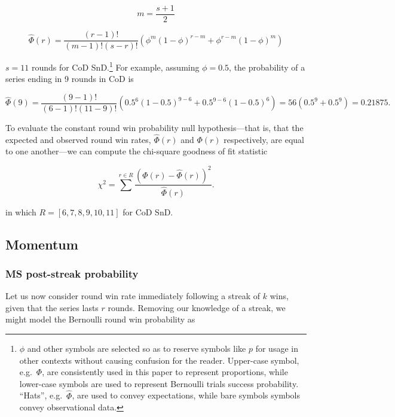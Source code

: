 \documentclass{article}
\begin{document}
\begin{equation}\label{eq:m}
m = \frac{s + 1}{2}
\end{equation}

\begin{equation}\label{eq:series-length}
\hat{\Phi}(r) = \frac{(r - 1)!}{(m - 1)!(s - r)!}(\phi^{m}(1 - \phi)^{r - m} + \phi^{r - m}(1 - \phi)^m)
\end{equation}

\(s = 11\) rounds for CoD SnD.\footnote{\(\phi\) and other symbols are
  selected so as to reserve symbols like \(p\) for usage in other
  contexts without causing confusion for the reader. Upper-case symbol,
  e.g.~\(\Phi\), are consistently used in this paper to represent
  proportions, while lower-case symbols are used to represent Bernoulli
  trials success probability. ``Hats'', e.g.~\(\hat{\Phi}\), are used to
  convey expectations, while bare symbols symbols convey observational
  data.} For example, assuming \(\phi = 0.5\), the probability of a
series ending in 9 rounds in CoD is

\[
\hat{\Phi}(9) = \frac{(9 - 1)!}{(6 - 1)!(11 - 9)!}(0.5^{6}(1 - 0.5)^{9 - 6} + 0.5^{9 - 6}(1 - 0.5)^6) = 56 (0.5^9 + 0.5^9) = 0.21875.
\]

To evaluate the constant round win probability null hypothesis---that
is, that the expected and observed round win rates, \(\hat{\Phi}(r)\)
and \(\Phi(r)\) respectively, are equal to one another---we can compute
the chi-square goodness of fit statistic

\begin{equation}\label{eq:chi-squ}
\chi^2 = \sum^{r \in R} \frac{(\Phi(r) - \hat{\Phi}(r))^2}{\hat{\Phi}(r)}.
\end{equation}

in which \(R = [6, 7, 8, 9, 10, 11]\) for CoD SnD.

\hypertarget{momentum}{%
\subsection{Momentum}\label{momentum}}

\hypertarget{ms-post-streak-probability}{%
\subsubsection{MS post-streak
probability}\label{ms-post-streak-probability}}

Let us now consider round win rate immediately following a streak of
\(k\) wins, given that the series lasts \(r\) rounds. Removing our
knowledge of a streak, we might model the Bernoulli round win
probability as
\end{document}
